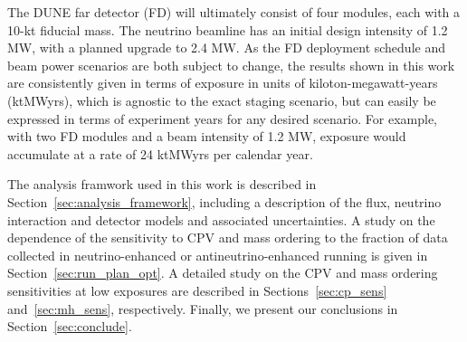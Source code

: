 The DUNE far detector (FD) will ultimately consist of four modules, each with a 10-kt fiducial mass. The neutrino beamline has an initial design intensity of 1.2 MW, with a planned upgrade to 2.4 MW. As the FD deployment schedule and beam power scenarios are both subject to change, the results shown in this work are consistently given in terms of exposure in units of kiloton-megawatt-years (ktMWyrs), which is agnostic to the exact staging scenario, but can easily be expressed in terms of experiment years for any desired scenario. For example, with two FD modules and a beam intensity of 1.2 MW, exposure would accumulate at a rate of 24 ktMWyrs per calendar year.

The analysis framwork used in this work is described in Section~\ref{sec:analysis_framework}, including a description of the flux, neutrino interaction and detector models and associated uncertainties. A study on the dependence of the sensitivity to CPV and mass ordering to the fraction of data collected in neutrino-enhanced or antineutrino-enhanced running is given in Section~\ref{sec:run_plan_opt}. A detailed study on the CPV and mass ordering sensitivities at low exposures are described in Sections~\ref{sec:cp_sens} and~\ref{sec:mh_sens}, respectively. Finally, we present our conclusions in Section~\ref{sec:conclude}.

